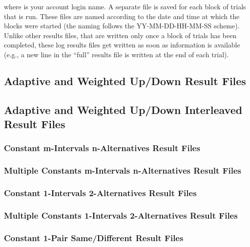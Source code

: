 \documentclass[a4paper,12pt,english]{sphinxmanual}
\begin{document}
where  is your account login name. A separate file is saved
for each block of trials that is run. These files are named according to
the date and time at which the blocks were started (the naming follows
the YY-MM-DD-HH-MM-SS scheme). Unlike other results files, that are
written only once a block of trials has been completed, these log
results files get written as soon as information is available (e.g., a
new line in the “full” results file is written at the end of each
trial).


\subsection{Adaptive and Weighted Up/Down Result Files}
\label{engine:adaptive-and-weighted-up-down-result-files}

\subsection{Adaptive and Weighted Up/Down Interleaved Result Files}
\label{engine:adaptive-and-weighted-up-down-interleaved-result-files}

\subsubsection{Constant m-Intervals n-Alternatives Result Files}
\label{engine:constant-m-intervals-n-alternatives-result-files}

\subsubsection{Multiple Constants m-Intervals n-Alternatives Result Files}
\label{engine:multiple-constants-m-intervals-n-alternatives-result-files}

\subsubsection{Constant 1-Intervals 2-Alternatives Result Files}
\label{engine:constant-1-intervals-2-alternatives-result-files}

\subsubsection{Multiple Constants 1-Intervals 2-Alternatives Result Files}
\label{engine:multiple-constants-1-intervals-2-alternatives-result-files}

\subsubsection{Constant 1-Pair Same/Different Result Files}
\label{engine:constant-1-pair-same-different-result-files}
\end{document}
